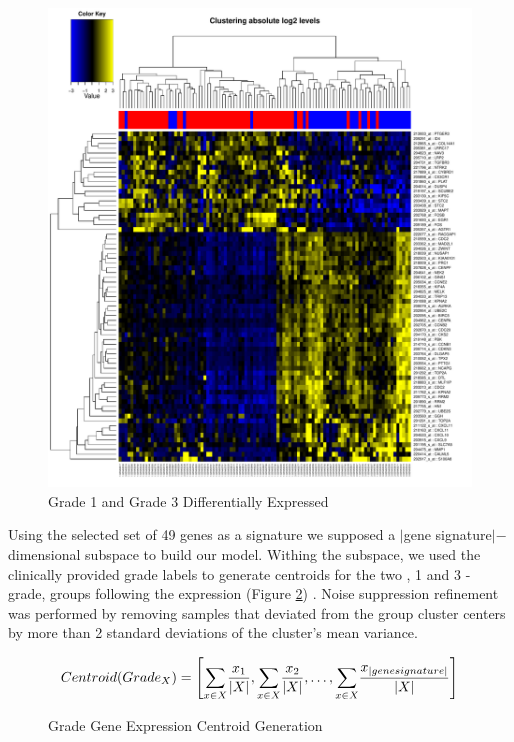\documentclass[a4paper,10pt]{article}
\begin{document}
\begin{figure}
\centering
\includegraphics[scale=0.30]{docs/grade1and3differentiallyexpressed}
\caption{Grade 1 and Grade 3 Differentially Expressed}\label{grade13diff}
\end{figure}
Using the selected set of 49 genes as a signature we supposed a $|$gene signature$|-$dimensional subspace to build our model.
Withing the subspace, we used the clinically provided grade labels to generate centroids for the two , 1 and 3 - grade, groups following
the expression (Figure \ref{centroid}) . Noise suppression refinement was performed by removing samples that deviated from the group cluster
centers by more than 2 standard deviations of the cluster's mean variance.\\
\begin{figure}
$$
Centroid(Grade_X)= \left[              \underset{x\in X}     \sum{  { {x_1}    \over {| X |} } }   ,   
 \underset{x\in X}     \sum{  { {x_2}    \over {| X |} } },
\ldots ,
 \underset{x\in X}     \sum{  { {x_{| gene signature |}}    \over {| X |} } }                 \right] 
$$
\caption{Grade Gene Expression Centroid Generation}\label{centroid}
\end{figure}
\end{document}
